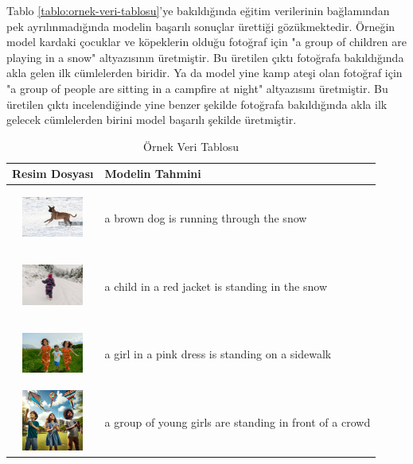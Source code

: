 \documentclass{article}
\begin{document}
Tablo \ref{tablo:ornek-veri-tablosu}'ye bakıldığında eğitim verilerinin bağlamından pek ayrılınmadığında modelin başarılı sonuçlar ürettiği gözükmektedir. Örneğin model kardaki çocuklar ve köpeklerin olduğu fotoğraf için "a group of children are playing in a snow" altyazısının üretmiştir. Bu üretilen çıktı fotoğrafa bakıldığında akla gelen ilk cümlelerden biridir. Ya da model yine kamp ateşi olan fotoğraf için "a group of people are sitting in a campfire at night" altyazısını üretmiştir. Bu üretilen çıktı incelendiğinde yine benzer şekilde fotoğrafa bakıldığında akla ilk gelecek cümlelerden birini model başarılı şekilde üretmiştir.

\begin{table}[!h]
\centering
\caption{Örnek Veri Tablosu}
\vspace{10pt}
\begin{tabular}{|c|p{10cm}|}
\hline
\textbf{Resim Dosyası} & \textbf{Modelin Tahmini} \\
\hline
\includegraphics[width=2cm,height=2cm]{resim1.jpg} & a brown dog is running through the snow \\
\hline
\includegraphics[width=2cm,height=2cm]{resim2.jpg} & a child in a red jacket is standing in the snow \\
\hline
\includegraphics[width=2cm,height=2cm]{yesillikte_kosan_cocuklar.jpg} & a girl in a pink dress is standing on a sidewalk \\
\hline
\includegraphics[width=2cm,height=2cm]{ucurtma_ucuran_cocuklar.jpg} & a group of young girls are standing in front of a crowd \\

\end{tabular}
\end{table}
\end{document}
